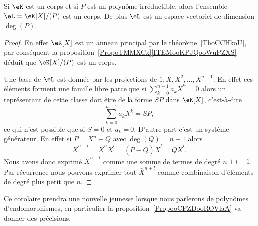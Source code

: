 \begin{corollary}       \label{CorsLGiEN}
	Si \( \eK\) est un corps et si \( P\) est un polynôme irréductible, alors l'ensemble \( \eL=\eK[X]/(P)\) est un corps. De plus \( \eL\) est un espace vectoriel de dimension \( \deg(P)\).
\end{corollary}

\begin{proof}
	En effet \( \eK[X]\) est un anneau principal par le théorème~\ref{ThoCCHkoU}, par conséquent la proposition~\ref{PropoTMMXCx}\ref{ITEMooKPJQooWuPZXS} déduit que \( \eK[X]/(P)\) est un corps.

	Une base de \( \eL\) est donnée par les projections de \( 1,X,X^2,\ldots, X^{n-1}\). En effet ces éléments forment une famille libre parce que si \( \sum_{k=0}^{n-1}a_k\bar X^n=0\) alors un représentant de cette classe doit être de la forme \( SP\) dans \( \eK[X]\), c'est-à-dire
	\begin{equation}
		\sum_{k=0}^{n-1}a_kX^k=SP,
	\end{equation}
	ce qui n'est possible que si \( S=0\) et \( a_k=0\). D'autre part c'est un système générateur. En effet si \( P=X^n+Q\) avec \( \deg(Q)=n-1\) alors
	\begin{equation}
		\bar X^{n+l}=\bar X^n\bar X^l=(\bar P-\bar Q)\bar X^l=\bar Q\bar X^l.
	\end{equation}
	Nous avons donc exprimé \( \bar X^{n+l}\) comme une somme de termes de degré \( n+l-1\). Par récurrence nous pouvons exprimer tout \( \bar X^{n+l}\) comme combinaison d'éléments de degré plus petit que \( n\).
\end{proof}

\begin{normaltext}
	Ce corolaire prendra une nouvelle jeunesse lorsque nous parlerons de polynômes d'endomorphismes, en particulier la proposition~\ref{PropooCFZDooROVlaA} va donner des précisions.
\end{normaltext}


